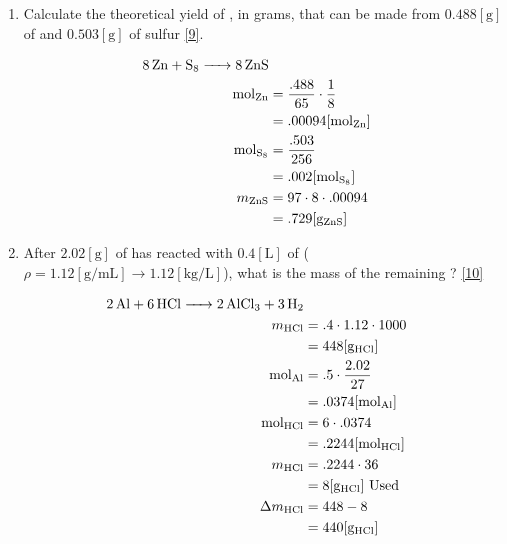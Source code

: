 \documentclass[12pt]{article}
\begin{document}
\begin{enumerate}
  \item Calculate the theoretical yield of , in grams, that can be made from $0.488[\si{\gram}]$ of  and $0.503[\si{\gram}]$ of sulfur \eqref{9}.

    \begin{equation}
      \begin{split}
        \ce{8Zn +S8 -> 8ZnS}\\
        \si{\mole}_{\ce{Zn}} & = \frac{.488}{65} \cdot\frac{1}{8} \\
        & = .00094[\si{\mole}_{\ce{Zn}}] \\
        \si{\mole}_{\ce{S8}} & = \frac{.503}{256} \\
        & = .002[\si{\mole}_{\ce{S8}}] \\
        m_{\ce{ZnS}} & = 97\cdot 8 \cdot .00094 \\
        & = .729[\si{\gram}_{\ce{ZnS}}]
      \end{split}
      \label{9}
    \end{equation}

  \item After $2.02[\si{\gram}]$ of  has reacted with $0.4[\si{\liter}]$ of  ($\rho = 1.12[\si{\gram\per\milli\liter}]\rightarrow 1.12[\si{\kilo\gram\per\liter}]$), what is the mass of the remaining ? \eqref{10}

      \begin{equation}
        \begin{split}
          \ce{2Al + 6HCl -> 2AlCl3 + 3H2} \\
          m_{\ce{HCl}} & = .4\cdot1.12\cdot1000\\
          & = 448[\si{\gram}_{\ce{HCl}}] \\
          \si{\mole}_{\ce{Al}} & = .5\cdot\frac{2.02}{27}\\
          & = .0374[\si{\mole}_{\ce{Al}}] \\
          \si{\mole}_{\ce{HCl}} & = 6\cdot .0374 \\
          & = .2244[\si{\mole}_{\ce{HCl}}] \\
          m_{\ce{HCl}} & = .2244\cdot 36 \\
          & = 8[\si{\gram}_{\ce{HCl}}] \text{ Used} \\
          \Delta m_{\ce{HCl}} & = 448 - 8 \\
          & = 440[\si{\gram}_{\ce{HCl}}]
        \end{split}
        \label{10}
      \end{equation}

\end{enumerate}
\end{document}
